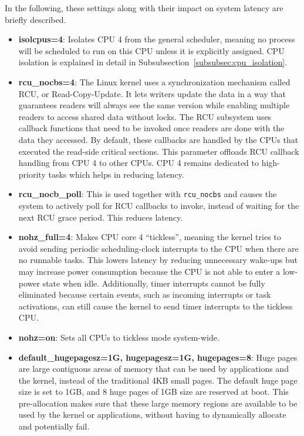 \documentclass[MMR,Master,english]{twbook}
\begin{document}
\noindent In the following, these settings along with their impact on system latency are briefly described.

\begin{itemize}
	\item \textbf{isolcpus=4}: Isolates CPU 4 from the general scheduler, meaning no process will be scheduled to run on this CPU unless it is explicitly assigned. CPU isolation is explained in detail in Subsubsection~\ref{subsubsec:cpu_isolation}.
	\item \textbf{rcu\_nocbs=4}: The Linux kernel uses a synchronization mechanism called RCU, or Read-Copy-Update. It lets writers update the data in a way that guarantees readers will always see the same version while enabling multiple readers to access shared data without locks. The RCU subsystem uses callback functions that need to be invoked once readers are done with the data they accessed. By default, these callbacks are handled by the CPUs that executed the read-side critical sections. This parameter offloads RCU callback handling from CPU 4 to other CPUs. CPU 4 remains dedicated to high-priority tasks which helps in reducing latency.
	\item \textbf{rcu\_nocb\_poll}: This is used together with \texttt{rcu\_nocbs} and causes the system to actively poll for RCU callbacks to invoke, instead of waiting for the next RCU grace period. This reduces latency.
	\item \textbf{nohz\_full=4}: Makes CPU core 4 ``tickless'', meaning the kernel tries to avoid sending periodic scheduling-clock interrupts to the CPU when there are no runnable tasks. This lowers latency by reducing unnecessary wake-ups but may increase power consumption because the CPU is not able to enter a low-power state when idle. Additionally, timer interrupts cannot be fully eliminated because certain events, such as incoming interrupts or task activations, can still cause the kernel to send timer interrupts to the tickless CPU.
	\item \textbf{nohz=on}: Sets all CPUs to tickless mode system-wide.
	\item \textbf{default\_hugepagesz=1G, hugepagesz=1G, hugepages=8}: Huge pages are large contiguous areas of memory that can be used by applications and the kernel, instead of the traditional 4KB small pages. The default huge page size is set to 1GB, and 8 huge pages of 1GB size are reserved at boot. This pre-allocation makes sure that these large memory regions are available to be used by the kernel or applications, without having to dynamically allocate and potentially fail.

\end{itemize}
\end{document}
